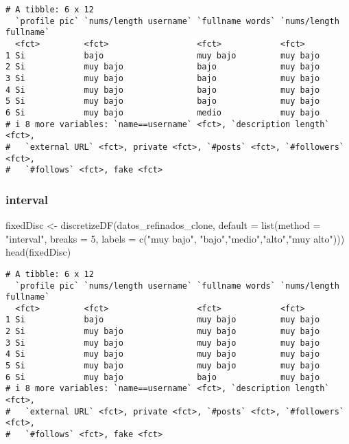 \documentclass[
  letterpaper,
  DIV=11,
  numbers=noendperiod]{scrreprt}
\newenvironment{Shaded}{\begin{snugshade}}{\end{snugshade}}
\newcommand{\AttributeTok}[1]{\textcolor[rgb]{0.40,0.45,0.13}{#1}}
\newcommand{\DecValTok}[1]{\textcolor[rgb]{0.68,0.00,0.00}{#1}}
\newcommand{\FunctionTok}[1]{\textcolor[rgb]{0.28,0.35,0.67}{#1}}
\newcommand{\NormalTok}[1]{\textcolor[rgb]{0.00,0.23,0.31}{#1}}
\newcommand{\OtherTok}[1]{\textcolor[rgb]{0.00,0.23,0.31}{#1}}
\newcommand{\StringTok}[1]{\textcolor[rgb]{0.13,0.47,0.30}{#1}}
\begin{document}
\begin{verbatim}
# A tibble: 6 x 12
  `profile pic` `nums/length username` `fullname words` `nums/length fullname`
  <fct>         <fct>                  <fct>            <fct>                 
1 Si            bajo                   muy bajo         muy bajo              
2 Si            muy bajo               bajo             muy bajo              
3 Si            muy bajo               bajo             muy bajo              
4 Si            muy bajo               bajo             muy bajo              
5 Si            muy bajo               bajo             muy bajo              
6 Si            muy bajo               medio            muy bajo              
# i 8 more variables: `name==username` <fct>, `description length` <fct>,
#   `external URL` <fct>, private <fct>, `#posts` <fct>, `#followers` <fct>,
#   `#follows` <fct>, fake <fct>
\end{verbatim}

\subsubsection{interval}\label{interval}

\begin{Shaded}
\begin{Highlighting}[]
\NormalTok{fixedDisc }\OtherTok{\textless{}{-}} \FunctionTok{discretizeDF}\NormalTok{(datos\_refinados\_clone, }\AttributeTok{default =} \FunctionTok{list}\NormalTok{(}\AttributeTok{method =} \StringTok{"interval"}\NormalTok{, }\AttributeTok{breaks =} \DecValTok{5}\NormalTok{, }
  \AttributeTok{labels =} \FunctionTok{c}\NormalTok{(}\StringTok{"muy bajo"}\NormalTok{, }\StringTok{"bajo"}\NormalTok{,}\StringTok{"medio"}\NormalTok{,}\StringTok{"alto"}\NormalTok{,}\StringTok{"muy alto"}\NormalTok{)))}
\FunctionTok{head}\NormalTok{(fixedDisc)}
\end{Highlighting}
\end{Shaded}

\begin{verbatim}
# A tibble: 6 x 12
  `profile pic` `nums/length username` `fullname words` `nums/length fullname`
  <fct>         <fct>                  <fct>            <fct>                 
1 Si            bajo                   muy bajo         muy bajo              
2 Si            muy bajo               muy bajo         muy bajo              
3 Si            muy bajo               muy bajo         muy bajo              
4 Si            muy bajo               muy bajo         muy bajo              
5 Si            muy bajo               muy bajo         muy bajo              
6 Si            muy bajo               bajo             muy bajo              
# i 8 more variables: `name==username` <fct>, `description length` <fct>,
#   `external URL` <fct>, private <fct>, `#posts` <fct>, `#followers` <fct>,
#   `#follows` <fct>, fake <fct>
\end{verbatim}
\end{document}
